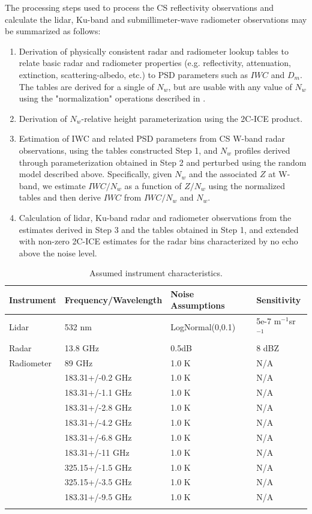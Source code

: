 \documentclass{ametsocV6.1}
\begin{document}
The processing steps used to process the CS reflectivity observations and calculate the lidar, Ku-band and 
submillimeter-wave radiometer observations may be summarized as follows:
\begin{enumerate}
\item Derivation of physically consistent radar and radiometer lookup tables to relate basic radar and 
radiometer properties (e.g. reflectivity, attenuation, extinction, scattering-albedo, etc.) to PSD parameters 
such as $IWC$ and $D_m$. The tables are derived for a single of $N_w$, but are usable with any value of 
$N_w$ using the "normalization" operations described in \citep{grecu2011}.
\item Derivation of $N_w$-relative height parameterization using the 2C-ICE product.
\item Estimation of IWC and related PSD parameters from CS W-band radar observations, using the tables 
constructed Step 1, and $N_w$ profiles derived through parameterization obtained in Step 2 and perturbed using the random model 
described above. Specifically, given $N_w$ and the associated $Z$ at W-band, we estimate $IWC/N_w$ as a function of $Z/N_w$ using the
normalized tables and then derive $IWC$ from $IWC/N_w$ and $N_w$.
\item Calculation of lidar, Ku-band radar and radiometer observations from the estimates derived in Step 3 
and the tables obtained in Step 1, and extended with non-zero 2C-ICE estimates for the radar bins characterized by no echo
above the noise level.
\end{enumerate}

\begin{table}
    \caption{Assumed instrument characteristics.}\label{t_sensors}
    \begin{center}
    \begin{tabular}{llll}

    Instrument & Frequency/Wavelength & Noise Assumptions& Sensitivity \\
    \hline
    Lidar & 532 nm & LogNormal(0,0.1) & 5e-7 m$^{-1}$sr$^{-1}$ \\
    \hline
    Radar & 13.8 GHz & 0.5dB & 8 dBZ \\
    \hline
    Radiometer & 89 GHz & 1.0 K & N/A \\
    & 183.31+/-0.2 GHz & 1.0 K & N/A \\
    & 183.31+/-1.1 GHz & 1.0 K & N/A \\
    & 183.31+/-2.8 GHz & 1.0 K & N/A \\
    & 183.31+/-4.2 GHz & 1.0 K & N/A \\
    & 183.31+/-6.8 GHz & 1.0 K & N/A \\
    & 183.31+/-11 GHz & 1.0 K & N/A \\
    & 325.15+/-1.5 GHz & 1.0 K & N/A \\
    & 325.15+/-3.5 GHz & 1.0 K & N/A \\
    & 183.31+/-9.5 GHz & 1.0 K & N/A \\
   \hline \\
    
    \end{tabular}
\end{center}
\end{table}
\end{document}
